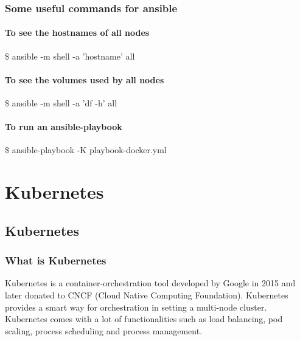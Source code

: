 \documentclass[12pt]{report}
\begin{document}
\subsection{Some useful commands for ansible}
\subsubsection{To see the hostnames of all nodes}
\$ ansible -m shell -a 'hostname' all
\subsubsection{To see the volumes used by all nodes}
\$ ansible -m shell -a 'df -h' all
\subsubsection{To run an ansible-playbook}
\$ ansible-playbook  -K playbook-docker.yml
\chapter{Kubernetes}
\section{Kubernetes\cite{Kubernetes}}
\subsection{What is Kubernetes}
Kubernetes is a container-orchestration tool developed by Google in 2015 and later donated to CNCF (Cloud Native Computing Foundation). Kubernetes provides a smart way for orchestration in setting a multi-node cluster. Kubernetes comes with a lot of functionalities such as load balancing, pod scaling, process scheduling and process management.
\end{document}
